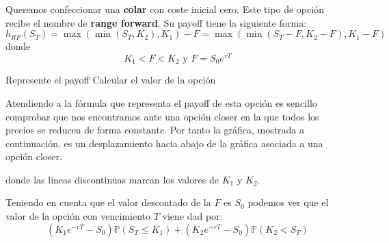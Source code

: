 \begin{problem}[5]
Queremos confeccionar una \textbf{colar} con coste inicial cero. Este tipo de opción recibe el nombre de \textbf{range forward}. Su payoff tiene la siguiente forma:
\[h_{RF}(S_T) = \max(\min(S_T,K_2),K_1)-F = \max(\min(S_T-F,K_2-F),K_1-F)\]
donde
\[K_1 < F < K_2 \text{ y } F=S_0e^{rT}\]

\ppart Represente el payoff
\ppart Calcular el valor de la opción
\solution
{}

\spart
Atendiendo a la fórmula que representa el payoff de esta opción es sencillo comprobar que nos encontramos ante una opción closer en la que todos los precios se reducen de forma constante. Por tanto la gráfica, mostrada a continuación, es un desplazamiento hacia abajo de la gráfica asociada a una opción closer.

\begin{center}
\end{center}

donde las lineas discontinuas marcan los valores de $K_1$ y $K_2$.

\spart

Teniendo en cuenta que el valor descontado de la $F$ es $S_0$ podemos ver que el valor de la opción con vencimiento $T$ viene dad por:
\[(K_1e^{-rT}-S_0)\mathbb{P}(S_T\leq K_1) + (K_2e^{-rT}-S_0)\mathbb{P}(K_2 < S_T)\]

\end{problem}

